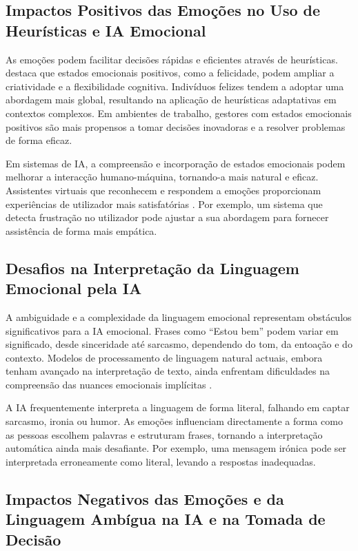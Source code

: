 \documentclass[a4paper,12pt]{report}
\begin{document}
	\subsection{Impactos Positivos das Emoções no Uso de Heurísticas e IA Emocional}
	
	As emoções podem facilitar decisões rápidas e eficientes através de heurísticas. \textcite{isen2001} destaca que estados emocionais positivos, como a felicidade, podem ampliar a criatividade e a flexibilidade cognitiva. Indivíduos felizes tendem a adoptar uma abordagem mais global, resultando na aplicação de heurísticas adaptativas em contextos complexos. Em ambientes de trabalho, gestores com estados emocionais positivos são mais propensos a tomar decisões inovadoras e a resolver problemas de forma eficaz.
	
	Em sistemas de IA, a compreensão e incorporação de estados emocionais podem melhorar a interacção humano-máquina, tornando-a mais natural e eficaz. Assistentes virtuais que reconhecem e respondem a emoções proporcionam experiências de utilizador mais satisfatórias \parencite{picard1997}. Por exemplo, um sistema que detecta frustração no utilizador pode ajustar a sua abordagem para fornecer assistência de forma mais empática.
	
	\subsection{Desafios na Interpretação da Linguagem Emocional pela IA}
	
	A ambiguidade e a complexidade da linguagem emocional representam obstáculos significativos para a IA emocional. Frases como “Estou bem” podem variar em significado, desde sinceridade até sarcasmo, dependendo do tom, da entoação e do contexto. Modelos de processamento de linguagem natural actuais, embora tenham avançado na interpretação de texto, ainda enfrentam dificuldades na compreensão das nuances emocionais implícitas \parencite{russell2020}.
	
	A IA frequentemente interpreta a linguagem de forma literal, falhando em captar sarcasmo, ironia ou humor. As emoções influenciam directamente a forma como as pessoas escolhem palavras e estruturam frases, tornando a interpretação automática ainda mais desafiante. Por exemplo, uma mensagem irónica pode ser interpretada erroneamente como literal, levando a respostas inadequadas.
	
	\subsection{Impactos Negativos das Emoções e da Linguagem Ambígua na IA e na Tomada de Decisão}
	
\end{document}
